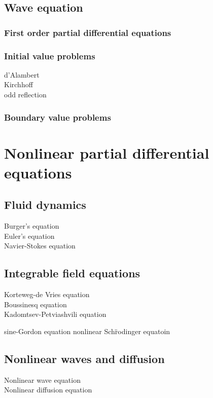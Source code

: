\documentclass{../note}
\begin{document}
\chapter{Wave equation}
\section{First order partial differential equations}
\section{Initial value problems}
d'Alambert\\
Kirchhoff\\
odd reflection

\section{Boundary value problems}







\part{Nonlinear partial differential equations}

\chapter{Fluid dynamics}
Burger's equation\\
Euler's equation\\
Navier-Stokes equation

\chapter{Integrable field equations}
Korteweg-de Vries equation\\
Boussinesq equation\\
Kadomtsev-Petviashvili equation

sine-Gordon equation
nonlinear Sch\"rodinger equatoin

\chapter{Nonlinear waves and diffusion}
Nonlinear wave equation\\
Nonlinear diffusion equation
\end{document}
